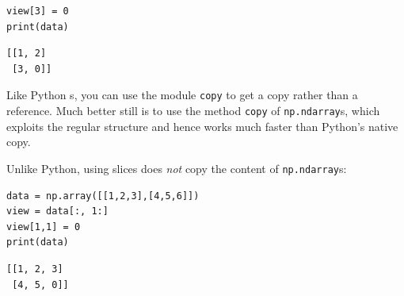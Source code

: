 \begin{frame}[fragile]
\begin{tcolorbox}[title=Memory Model: \texttt{np.ndarray}s]
\begin{center}
\begin{tikzpicture}
  \end{tikzpicture}
\end{center}
%
\begin{tcbraster}[raster columns=2,
                  raster equal height,
                  nobeforeafter,
                  raster column skip=0.5cm]
\begin{codebox}
\begin{verbatim}
view[3] = 0
print(data)
\end{verbatim}
\end{codebox}
%
\begin{cmdbox}
\begin{verbatim}
[[1, 2]
 [3, 0]]
\end{verbatim}
\end{cmdbox}
\end{tcbraster}
\end{tcolorbox}
%
\end{frame}


\begin{frame}[fragile]
%
\begin{hintbox}
Like Python s, you can use the module \texttt{copy} to get a copy rather than a reference. Much better still is to use the method \texttt{copy} of \texttt{np.ndarray}s, which exploits the regular structure and hence works much faster than Python's native copy.
\end{hintbox}
%
\begin{warnbox}
Unlike Python, using slices does \emph{not} copy the content of \texttt{np.ndarray}s:

\vspace{4pt}
\begin{tcbraster}[raster columns=2,
                  raster equal height,
                  nobeforeafter,
                  raster column skip=0.5cm]
\begin{codebox}
\begin{verbatim}
data = np.array([[1,2,3],[4,5,6]])
view = data[:, 1:]
view[1,1] = 0
print(data)
\end{verbatim}
\end{codebox}
%
\begin{cmdbox}
\begin{verbatim}
[[1, 2, 3]
 [4, 5, 0]]
\end{verbatim}
\end{cmdbox}
\end{tcbraster}

\end{warnbox}
%
\end{frame}

